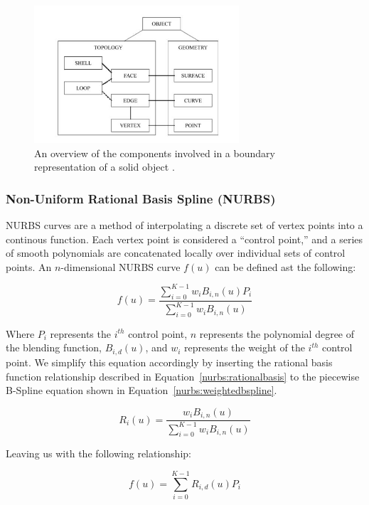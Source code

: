 \documentclass[12pt]{drexelthesis}
\let\Oldsubsubsection\subsubsection
\renewcommand{\subsubsection}{\FloatBarrier\Oldsubsubsection}
\begin{document}
\begin{figure}
	\centering
		\includegraphics[width=3in]{cadTypes/brep.jpg}
	\caption[Components of a boundary representation.]{\centering An overview of the components involved in a boundary representation of a solid object \cite{Stroud2006}.}
\end{figure}

\subsubsection{Non-Uniform Rational Basis Spline (NURBS)}
NURBS curves are a method of interpolating a discrete set of vertex points into a continous function. Each vertex point is considered a ``control point,'' and a series of smooth polynomials are concatenated locally over individual sets of control points. An $n$-dimensional NURBS curve $f(u)$ can be defined ast the following:

\begin{equation}
	f(u) = \frac    {   \sum_{i=0}^{K-1} w_{i} B_{i,n}(u) P_{i} }
				 	{  \sum_{i=0}^{K-1} w_{i} B_{i,n}(u) }
	\label{nurbs:weightedbspline}
 \end{equation}
 
 Where $P_{i}$ represents the $i^{th}$ control point, $n$ represents the polynomial degree of the blending function, $B_{i,d}(u)$, and $w_{i}$ represents the weight of the $i^{th}$ control point. We simplify this equation accordingly by inserting the rational basis function relationship described in Equation~\ref{nurbs:rationalbasis} to the piecewise B-Spline equation shown in Equation~\ref{nurbs:weightedbspline}.
 
\begin{equation}
	R_{i}(u) = \frac    {   w_{i} B_{i,n}(u)}
				 		{  \sum_{i=0}^{K-1} w_{i} B_{i,n}(u) }
	\label{nurbs:rationalbasis}
 \end{equation}
 
 Leaving us with the following relationship:
 
 \begin{equation}
 	f(u) = \sum_{i=0}^{K-1} R_{i,d}(u) P_{i}
\end{equation}
\end{document}
